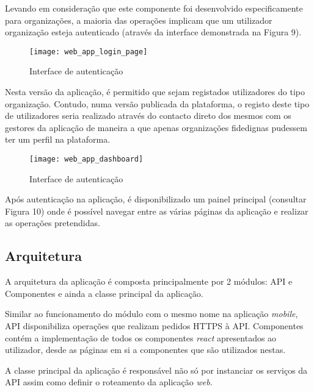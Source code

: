 Levando em consideração que este componente foi desenvolvido especificamente para organizações, a maioria das operações implicam que um utilizador organização esteja autenticado (através da interface demonstrada na Figura 9).

\begin{figure}[h]
	\centering
	\texttt{[image: web\_app\_login\_page]}
	\caption{Interface de autenticação}
\end{figure}

Nesta versão da aplicação, é permitido que sejam registados utilizadores do tipo organização. Contudo, numa versão publicada da plataforma, o registo deste tipo de utilizadores seria realizado através do contacto direto dos mesmos com os gestores da aplicação de maneira a que apenas organizações fidedignas pudessem ter um perfil na plataforma.

\par \medskip

\begin{figure}[h]
	\centering
	\texttt{[image: web\_app\_dashboard]}
	\caption{Interface de autenticação}
\end{figure}

Após autenticação na aplicação, é disponibilizado um painel principal (consultar Figura 10) onde é possível navegar entre as várias páginas da aplicação e realizar as operações pretendidas.

\par \medskip

\subsection{Arquitetura}

A arquitetura da aplicação é composta principalmente por 2 módulos: API e Componentes e ainda a classe principal da aplicação.

\par \medskip 

Similar ao funcionamento do módulo com o mesmo nome na aplicação \textit{mobile}, API disponibiliza operações que realizam pedidos HTTPS à API. Componentes contém a implementação de todos os componentes \textit{react} apresentados ao utilizador, desde as páginas em si a componentes que são utilizados nestas. 

\par \medskip

A classe principal da aplicação é responsável não só por instanciar os serviços da API assim como definir o roteamento da aplicação \textit{web}.

